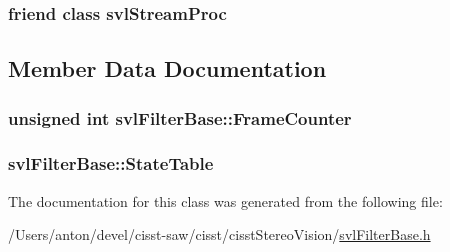 \subsubsection[{svl\+Stream\+Proc}]{\setlength{\rightskip}{0pt plus 5cm}friend class {\bf svl\+Stream\+Proc}\hspace{0.3cm}{\ttfamily [friend]}}\label{classsvl_filter_base_a6a9ee1dec5ca263793dca09411295245}


\subsection{Member Data Documentation}
\hypertarget{classsvl_filter_base_ab12326fbaf20f3fe944aaa675a414c01}{}
\subsubsection[{Frame\+Counter}]{\setlength{\rightskip}{0pt plus 5cm}unsigned int svl\+Filter\+Base\+::\+Frame\+Counter\hspace{0.3cm}{\ttfamily [protected]}}\label{classsvl_filter_base_ab12326fbaf20f3fe944aaa675a414c01}
\hypertarget{classsvl_filter_base_a4abb6f966a72129f536745763e71820b}{}
\subsubsection[{State\+Table}]{ svl\+Filter\+Base\+::\+State\+Table\hspace{0.3cm}{\ttfamily [protected]}}\label{classsvl_filter_base_a4abb6f966a72129f536745763e71820b}


The documentation for this class was generated from the following file\+:\begin{DoxyCompactItemize}
\item 
/\+Users/anton/devel/cisst-\/saw/cisst/cisst\+Stereo\+Vision/\hyperlink{svl_filter_base_8h}{svl\+Filter\+Base.\+h}\end{DoxyCompactItemize}
